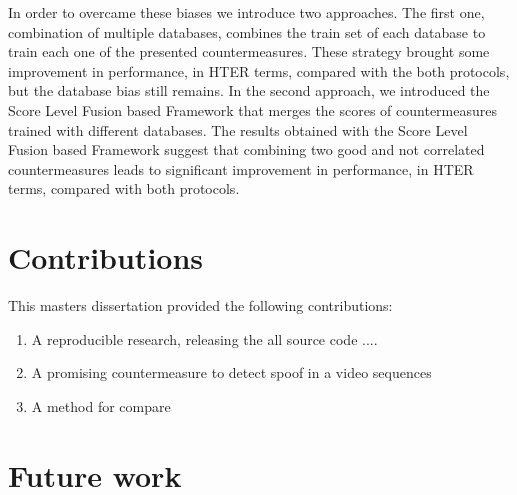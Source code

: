 In order to overcame these biases we introduce two approaches. The first one, combination of multiple databases, combines the train set of each database to train each one of the presented countermeasures. These strategy brought some improvement in performance, in HTER terms, compared with the both protocols, but the database bias still remains. In the second approach, we introduced the Score Level Fusion based Framework that merges the scores of countermeasures trained with different databases. The results obtained with the Score Level Fusion based Framework suggest that combining two good and not correlated countermeasures leads to significant improvement in performance, in HTER terms, compared with both protocols.


\section{Contributions}

This masters dissertation provided the following contributions:

\begin{enumerate}
	\item A reproducible research, releasing the all source code ....
	\item A promising countermeasure to detect spoof in a video sequences
	\item A method for compare  
\end{enumerate}

\section{Future work}




